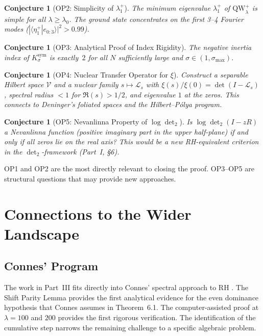 \documentclass[12pt,a4paper]{article}
\newtheorem{conjecture}[theorem]{Conjecture}
\theoremstyle{definition}
\theoremstyle{remark}
\newcommand{\Ksym}{K_\sigma^{\mathrm{sym}}}
\begin{document}
\begin{conjecture}[OP2: Simplicity of $\lambda_1^+$]
\label{conj:OP2}
The minimum eigenvalue $\lambda_1^+$ of $\mathrm{QW}_\lambda^+$ is simple for all $\lambda \geq \lambda_0$. The ground state concentrates on the first 3--4 Fourier modes ($|\langle \eta_1^+ | e_{0:3} \rangle|^2 > 0.99$).
\end{conjecture}

\begin{conjecture}[OP3: Analytical Proof of Index Rigidity]
\label{conj:OP3}
The negative inertia index of $\Ksym$ is exactly~$2$ for all $N$ sufficiently large and $\sigma \in (1, \sigma_{\max})$.
\end{conjecture}

\begin{conjecture}[OP4: Nuclear Transfer Operator for $\xi$]
\label{conj:OP4}
Construct a separable Hilbert space $\mathcal{V}$ and a nuclear family $s \mapsto \mathcal{L}_s$ with $\xi(s)/\xi(0) = \det(I - \mathcal{L}_s)$, spectral radius $< 1$ for $\Re(s) > 1/2$, and eigenvalue $1$ at the zeros. This connects to Deninger's foliated spaces and the Hilbert--P\'olya program.
\end{conjecture}

\begin{conjecture}[OP5: Nevanlinna Property of $\log\det_2$]
\label{conj:OP5}
Is $\log\det_2(I - zR)$ a Nevanlinna function (positive imaginary part in the upper half-plane) if and only if all zeros lie on the real axis? This would be a new RH-equivalent criterion in the $\det_2$-framework (Part~I, \S6).
\end{conjecture}

\noindent OP1 and OP2 are the most directly relevant to closing the proof. OP3--OP5 are structural questions that may provide new approaches.


\section{Connections to the Wider Landscape}
\label{sec:connections}

\subsection{Connes' Program}

The work in Part~III fits directly into Connes' spectral approach to RH \cite{Connes2025}. The Shift Parity Lemma provides the first analytical evidence for the even dominance hypothesis that Connes assumes in Theorem~6.1. The computer-assisted proof at $\lambda = 100$ and $200$ provides the first rigorous verification. The identification of the cumulative step narrows the remaining challenge to a specific algebraic problem.
\end{document}
